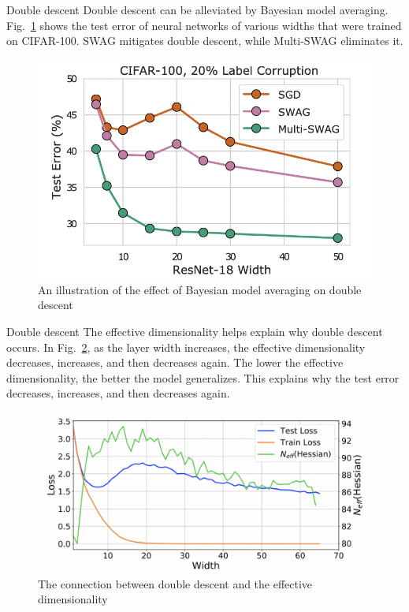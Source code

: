 \documentclass{beamer}
\begin{document}
\begin{frame}{Double descent}
    Double descent can be alleviated by Bayesian model averaging. Fig.~\ref{fig:double_descent_and_bma} shows the test error of neural networks of various widths that were trained on CIFAR-100. SWAG mitigates double descent, while Multi-SWAG eliminates it.
    \begin{figure}
        \centering
        \includegraphics[scale=0.5]{double_descent_and_bma}
        \caption{An illustration of the effect of Bayesian model averaging on double descent}
        \label{fig:double_descent_and_bma}
    \end{figure}
\end{frame}

\begin{frame}{Double descent}
    The effective dimensionality helps explain why double descent occurs. In Fig.~\ref{fig:double_descent_and_effective_dimensionality}, as the layer width increases, the effective dimensionality decreases, increases, and then decreases again. The lower the effective dimensionality, the better the model generalizes. This explains why the test error decreases, increases, and then decreases again.
    \begin{figure}
        \centering
        \includegraphics[scale=0.5]{double_descent_and_effective_dimensionality}
        \caption{The connection between double descent and the effective dimensionality}
        \label{fig:double_descent_and_effective_dimensionality}
    \end{figure}
\end{frame}
\end{document}
